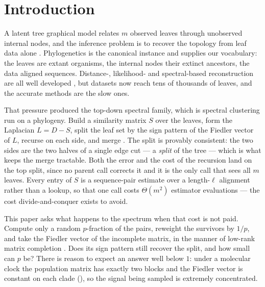 \section{Introduction}\label{sec:intro}

A latent tree graphical model relates $m$ observed leaves through unobserved
internal nodes, and the inference problem is to recover the topology from leaf
data alone \cite{aizenbud2023spectral, semple2003phylogenetics}. Phylogenetics is
the canonical instance and supplies our vocabulary: the leaves are extant
organisms, the internal nodes their extinct ancestors, the data aligned
sequences. Distance-, likelihood- and spectral-based reconstruction are all well
developed \cite{saitou1987neighbor, erdos1999logs, jaffe2021spectral,
mossel2005learning}, but datasets now reach tens of thousands of leaves, and the
accurate methods are the slow ones.

That pressure produced the top-down spectral family, which is spectral clustering
run on a phylogeny. Build a similarity matrix $S$ over the leaves, form the
Laplacian $L=D-S$, split the leaf set by the sign pattern of the Fiedler vector
of $L$, recurse on each side, and merge \cite{aizenbud2023spectral,
vonluxburg2007tutorial, fiedler1975property}. The split is provably consistent:
the two sides are the two halves of a single edge cut --- a \emph{split} of the tree
\cite{wilkinson2007clades} --- which is what keeps the merge tractable. Both the
error and the cost of the recursion land on the top split, since no parent call
corrects it and it is the only call that sees all $m$ leaves. Every entry of $S$
is a sequence-pair estimate over a length-$\ell$ alignment rather than a lookup,
so that one call costs $\Theta(m^2)$ estimator evaluations --- the cost
divide-and-conquer exists to avoid.

This paper asks what happens to the spectrum when that cost is not paid. Compute
only a random $p$-fraction of the pairs, reweight the survivors by $1/p$, and
take the Fiedler vector of the incomplete matrix, in the manner of low-rank
matrix completion \cite{candes2008exact, candes2009power, candes2009matrix,
recht2011simpler, keshavan2010matrix, bhojanapalli2014universal}. Does its sign
pattern still recover the split, and how small can $p$ be? There is reason to
expect an answer well below $1$: under a molecular clock the population matrix
has exactly two blocks and the Fiedler vector is constant on each clade
(), so the signal being sampled is extremely concentrated.

